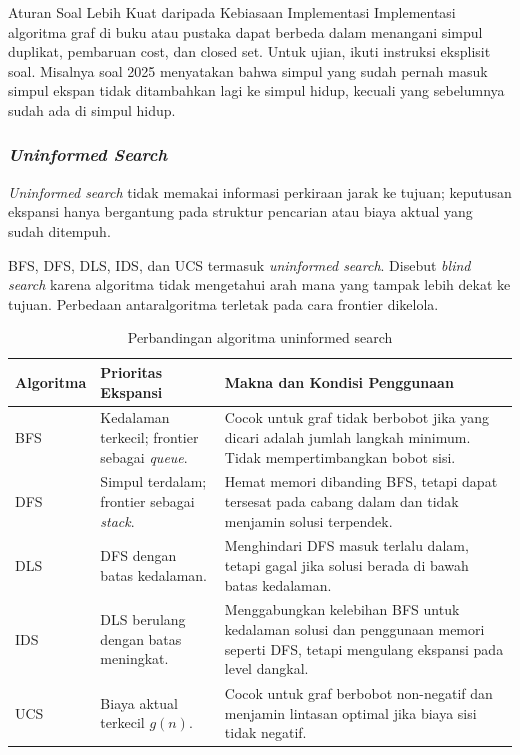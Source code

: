 \begin{cmt}{Aturan Soal Lebih Kuat daripada Kebiasaan Implementasi}{}
Implementasi algoritma graf di buku atau pustaka dapat berbeda dalam menangani simpul duplikat, pembaruan cost, dan closed set. Untuk ujian, ikuti instruksi eksplisit soal. Misalnya soal 2025 menyatakan bahwa simpul yang sudah pernah masuk simpul ekspan tidak ditambahkan lagi ke simpul hidup, kecuali yang sebelumnya sudah ada di simpul hidup.
\end{cmt}

\subsubsection{\textit{Uninformed Search}}

\begin{jawab}
\textit{Uninformed search} tidak memakai informasi perkiraan jarak ke tujuan; keputusan ekspansi hanya bergantung pada struktur pencarian atau biaya aktual yang sudah ditempuh.
\end{jawab}

BFS, DFS, DLS, IDS, dan UCS termasuk \textit{uninformed search}. Disebut \textit{blind search} karena algoritma tidak mengetahui arah mana yang tampak lebih dekat ke tujuan. Perbedaan antaralgoritma terletak pada cara frontier dikelola.

\begin{table}[H]
\centering
\small
\begin{tabularx}{\textwidth}{|L{0.18\textwidth}|L{0.23\textwidth}|X|}
\hline
\textbf{Algoritma} & \textbf{Prioritas Ekspansi} & \textbf{Makna dan Kondisi Penggunaan} \\
\hline
BFS & Kedalaman terkecil; frontier sebagai \textit{queue}. & Cocok untuk graf tidak berbobot jika yang dicari adalah jumlah langkah minimum. Tidak mempertimbangkan bobot sisi. \\
\hline
DFS & Simpul terdalam; frontier sebagai \textit{stack}. & Hemat memori dibanding BFS, tetapi dapat tersesat pada cabang dalam dan tidak menjamin solusi terpendek. \\
\hline
DLS & DFS dengan batas kedalaman. & Menghindari DFS masuk terlalu dalam, tetapi gagal jika solusi berada di bawah batas kedalaman. \\
\hline
IDS & DLS berulang dengan batas meningkat. & Menggabungkan kelebihan BFS untuk kedalaman solusi dan penggunaan memori seperti DFS, tetapi mengulang ekspansi pada level dangkal. \\
\hline
UCS & Biaya aktual terkecil $g(n)$. & Cocok untuk graf berbobot non-negatif dan menjamin lintasan optimal jika biaya sisi tidak negatif. \\
\hline
\end{tabularx}
\caption{Perbandingan algoritma uninformed search}
\label{tab:uninformed-route-planning}
\end{table}

